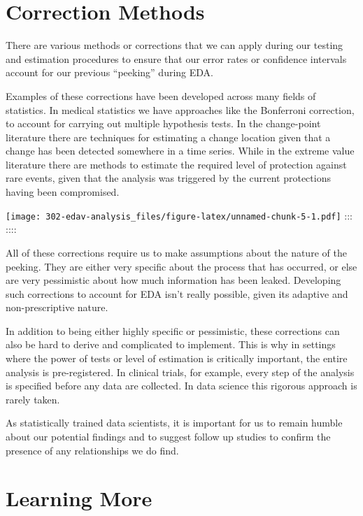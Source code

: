 \documentclass[
  12pt,
]{book}
\begin{document}
\hypertarget{correction-methods}{%
\section{Correction Methods}\label{correction-methods}}

There are various methods or corrections that we can apply during our testing and estimation procedures to ensure that our error rates or confidence intervals account for our previous ``peeking'' during EDA.

Examples of these corrections have been developed across many fields of statistics. In medical statistics we have approaches like the Bonferroni correction, to account for carrying out multiple hypothesis tests. In the change-point literature there are techniques for estimating a change location given that a change has been detected somewhere in a time series. While in the extreme value literature there are methods to estimate the required level of protection against rare events, given that the analysis was triggered by the current protections having been compromised.

\texttt{[image: 302-edav-analysis\_files/figure-latex/unnamed-chunk-5-1.pdf]}
:::
::::

All of these corrections require us to make assumptions about the nature of the peeking. They are either very specific about the process that has occurred, or else are very pessimistic about how much information has been leaked. Developing such corrections to account for EDA isn't really possible, given its adaptive and non-prescriptive nature.

In addition to being either highly specific or pessimistic, these corrections can also be hard to derive and complicated to implement. This is why in settings where the power of tests or level of estimation is critically important, the entire analysis is pre-registered. In clinical trials, for example, every step of the analysis is specified before any data are collected. In data science this rigorous approach is rarely taken.

As statistically trained data scientists, it is important for us to remain humble about our potential findings and to suggest follow up studies to confirm the presence of any relationships we do find.

\hypertarget{learning-more}{%
\section{Learning More}\label{learning-more}}
\end{document}
